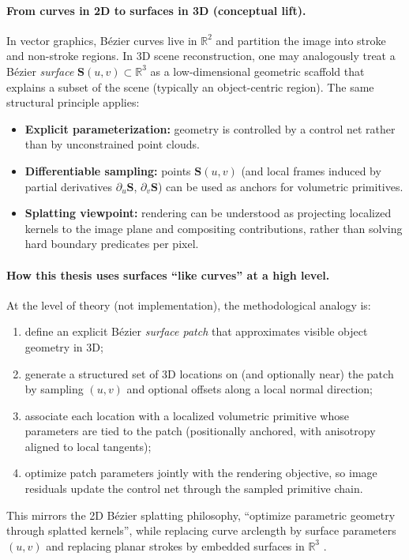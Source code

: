 \paragraph{From curves in 2D to surfaces in 3D (conceptual lift).}
In vector graphics, B\'ezier curves live in $\mathbb{R}^2$ and partition the image into stroke and non-stroke regions. In 3D scene reconstruction, one may analogously treat a B\'ezier \emph{surface} $\mathbf{S}(u,v)\subset\mathbb{R}^3$ as a low-dimensional geometric scaffold that explains a subset of the scene (typically an object-centric region). The same structural principle applies:
\begin{itemize}
    \item \textbf{Explicit parameterization:} geometry is controlled by a control net rather than by unconstrained point clouds.
    \item \textbf{Differentiable sampling:} points $\mathbf{S}(u,v)$ (and local frames induced by partial derivatives $\partial_u \mathbf{S}$, $\partial_v \mathbf{S}$) can be used as anchors for volumetric primitives.
    \item \textbf{Splatting viewpoint:} rendering can be understood as projecting localized kernels to the image plane and compositing contributions, rather than solving hard boundary predicates per pixel.
\end{itemize}

\paragraph{How this thesis uses surfaces ``like curves'' at a high level.}
At the level of theory (not implementation), the methodological analogy is:
\begin{enumerate}
    \item define an explicit B\'ezier \emph{surface patch} that approximates visible object geometry in 3D;
    \item generate a structured set of 3D locations on (and optionally near) the patch by sampling $(u,v)$ and optional offsets along a local normal direction;
    \item associate each location with a localized volumetric primitive whose parameters are tied to the patch (positionally anchored, with anisotropy aligned to local tangents);
    \item optimize patch parameters jointly with the rendering objective, so image residuals update the control net through the sampled primitive chain.
\end{enumerate}
This mirrors the 2D B\'ezier splatting philosophy, ``optimize parametric geometry through splatted kernels'', while replacing curve arclength by surface parameters $(u,v)$ and replacing planar strokes by embedded surfaces in $\mathbb{R}^3$ \cite{liu2025bezier}.

